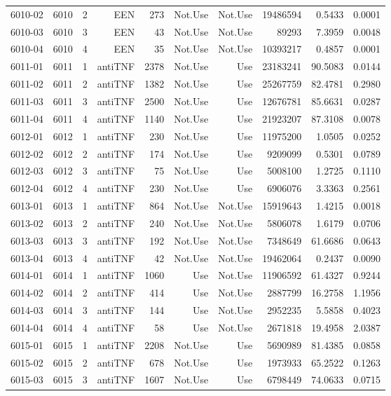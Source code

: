 {\begin{longtable}{ | r | r | r | r | r | r | r | r | r | r | }
6010-02 & 6010 & 2 & EEN & 273 & Not.Use & Not.Use & 19486594 & 0.5433 & 0.0001\\ 
6010-03 & 6010 & 3 & EEN & 43 & Not.Use & Not.Use & 89293 & 7.3959 & 0.0048\\ 
6010-04 & 6010 & 4 & EEN & 35 & Not.Use & Not.Use & 10393217 & 0.4857 & 0.0001\\ 
6011-01 & 6011 & 1 & antiTNF & 2378 & Not.Use & Use & 23183241 & 90.5083 & 0.0144\\ 
6011-02 & 6011 & 2 & antiTNF & 1382 & Not.Use & Use & 25267759 & 82.4781 & 0.2980\\ 
6011-03 & 6011 & 3 & antiTNF & 2500 & Not.Use & Use & 12676781 & 85.6631 & 0.0287\\ 
6011-04 & 6011 & 4 & antiTNF & 1140 & Not.Use & Use & 21923207 & 87.3108 & 0.0078\\ 
6012-01 & 6012 & 1 & antiTNF & 230 & Not.Use & Use & 11975200 & 1.0505 & 0.0252\\ 
6012-02 & 6012 & 2 & antiTNF & 174 & Not.Use & Use & 9209099 & 0.5301 & 0.0789\\ 
6012-03 & 6012 & 3 & antiTNF & 75 & Not.Use & Use & 5008100 & 1.2725 & 0.1110\\ 
6012-04 & 6012 & 4 & antiTNF & 230 & Not.Use & Use & 6906076 & 3.3363 & 0.2561\\ 
6013-01 & 6013 & 1 & antiTNF & 864 & Not.Use & Not.Use & 15919643 & 1.4215 & 0.0018\\ 
6013-02 & 6013 & 2 & antiTNF & 240 & Not.Use & Not.Use & 5806078 & 1.6179 & 0.0706\\ 
6013-03 & 6013 & 3 & antiTNF & 192 & Not.Use & Not.Use & 7348649 & 61.6686 & 0.0643\\ 
6013-04 & 6013 & 4 & antiTNF & 42 & Not.Use & Not.Use & 19462064 & 0.2437 & 0.0090\\ 
6014-01 & 6014 & 1 & antiTNF & 1060 & Use & Not.Use & 11906592 & 61.4327 & 0.9244\\ 
6014-02 & 6014 & 2 & antiTNF & 414 & Use & Not.Use & 2887799 & 16.2758 & 1.1956\\ 
6014-03 & 6014 & 3 & antiTNF & 144 & Use & Not.Use & 2952235 & 5.5858 & 0.4023\\ 
6014-04 & 6014 & 4 & antiTNF & 58 & Use & Not.Use & 2671818 & 19.4958 & 2.0387\\ 
6015-01 & 6015 & 1 & antiTNF & 2208 & Not.Use & Use & 5690989 & 81.4385 & 0.0858\\ 
6015-02 & 6015 & 2 & antiTNF & 678 & Not.Use & Use & 1973933 & 65.2522 & 0.1263\\ 
6015-03 & 6015 & 3 & antiTNF & 1607 & Not.Use & Use & 6798449 & 74.0633 & 0.0715\\ 

\end{longtable}}
